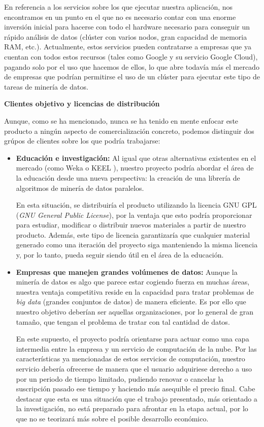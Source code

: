 En referencia a los servicios sobre los que ejecutar nuestra aplicación, nos encontramos en un punto en el que no es necesario contar con una enorme inversión inicial para hacerse con todo el hardware necesario para conseguir un rápido análisis de datos (clúster con varios nodos, gran capacidad de memoria RAM, etc.). Actualmente, estos servicios pueden contratarse a empresas que ya cuentan con todos estos recursos (tales como Google y su servicio Google Cloud), pagando solo por el uso que hacemos de ellos, lo que abre todavía más el mercado de empresas que podrían permitirse el uso de un clúster para ejecutar este tipo de tareas de minería de datos.

\textbf{Clientes objetivo y licencias de distribución}

Aunque, como se ha mencionado, nunca se ha tenido en mente enfocar este producto a ningún aspecto de comercialización concreto, podemos distinguir dos grúpos de clientes sobre los que podría trabajarse:

\begin{itemize}
\item \textbf{Educación e investigación:} Al igual que otras alternativas existentes en el mercado (como Weka \cite{WekaSoft} o KEEL \cite{KEELSoft1, KEELSoft2}), nuestro proyecto podría abordar el área de la educación desde una nueva perspectiva: la creación de una librería de algoritmos de minería de datos paralelos.

En esta situación, se distribuiría el producto utilizando la licencia GNU GPL (\textit{GNU General Public License}), por la ventaja que esto podría proporcionar para estudiar, modificar o distribuir nuevos materiales a partir de nuestro producto. Además, este tipo de licencia garantizaría que cualquier material generado como una iteración del proyecto siga manteniendo la misma licencia y, por lo tanto, pueda seguir siendo útil en el área de la educación.

\item \textbf{Empresas que manejen grandes volúmenes de datos:} Aunque la minería de datos es algo que parece estar cogiendo fuerza en muchas áreas, nuestra ventaja competitiva reside en la capacidad para tratar problemas de \textit{big data} (grandes conjuntos de datos) de manera eficiente. Es por ello que nuestro objetivo deberían ser aquellas organizaciones, por lo general de gran tamaño, que tengan el problema de tratar con tal cantidad de datos.

En este supuesto, el proyecto podría orientarse para actuar como una capa intermedia entre la empresa y un servicio de computación de la nube. Por las características ya mencionadas de estos servicios de computación, nuestro servicio debería ofrecerse de manera que el usuario adquiriese derecho a uso por un periodo de tiempo limitado, pudiendo renovar o cancelar la suscripción pasado ese tiempo y haciendo más asequible el precio final. Cabe destacar que esta es una situación que el trabajo presentado, más orientado a la investigación, no está preparado para afrontar en la etapa actual, por lo que no se teorizará más sobre el posible desarrollo económico.

\end{itemize}

